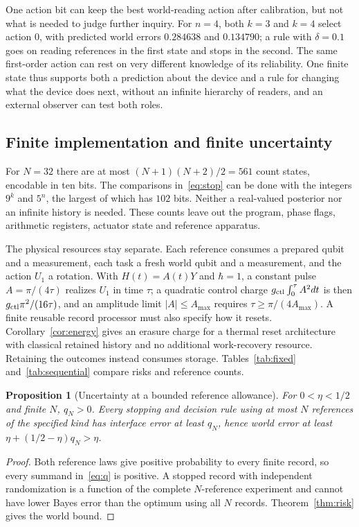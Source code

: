 \documentclass[11pt,a4paper]{article}
\newtheorem{proposition}[definition]{Proposition}
\begin{document}
One action bit can keep the best world-reading action after calibration, but not what is needed to judge further inquiry. For $n=4$, both $k=3$ and $k=4$ select action $0$, with predicted world errors $0.284638$ and $0.134790$; a rule with $\delta=0.1$ goes on reading references in the first state and stops in the second. The same first-order action can rest on very different knowledge of its reliability. One finite state thus supports both a prediction about the device and a rule for changing what the device does next, without an infinite hierarchy of readers, and an external observer can test both roles.

\subsection{Finite implementation and finite uncertainty}

For $N=32$ there are at most $(N+1)(N+2)/2=561$ count states, encodable in ten bits. The comparisons in~\eqref{eq:stop} can be done with the integers $9^k$ and $5^n$, the largest of which has $102$ bits. Neither a real-valued posterior nor an infinite history is needed. These counts leave out the program, phase flags, arithmetic registers, actuator state and reference apparatus.

The physical resources stay separate. Each reference consumes a prepared qubit and a measurement, each task a fresh world qubit and a measurement, and the action $U_1$ a rotation. With $H(t)=A(t)Y$ and $\hbar=1$, a constant pulse $A=\pi/(4\tau)$ realizes $U_1$ in time $\tau$; a quadratic control charge $g_{\rm ctl}\int_0^\tau A^2dt$ is then $g_{\rm ctl}\pi^2/(16\tau)$, and an amplitude limit $|A|\le A_{\max}$ requires $\tau\ge\pi/(4A_{\max})$. A finite reusable record processor must also specify how it resets. Corollary~\ref{cor:energy} gives an erasure charge for a thermal reset architecture with classical retained history and no additional work-recovery resource. Retaining the outcomes instead consumes storage. Tables~\ref{tab:fixed} and~\ref{tab:sequential} compare risks and reference counts.

\begin{proposition}[Uncertainty at a bounded reference allowance]\label{prop:finite}
For $0<\eta<1/2$ and finite $N$, $q_N>0$. Every stopping and decision rule using at most $N$ references of the specified kind has interface error at least $q_N$, hence world error at least $\eta+(1/2-\eta)q_N>\eta$.
\end{proposition}
\begin{proof}
Both reference laws give positive probability to every finite record, so every summand in~\eqref{eq:q} is positive. A stopped record with independent randomization is a function of the complete $N$-reference experiment and cannot have lower Bayes error than the optimum using all $N$ records. Theorem~\ref{thm:risk} gives the world bound.
\end{proof}
\end{document}
